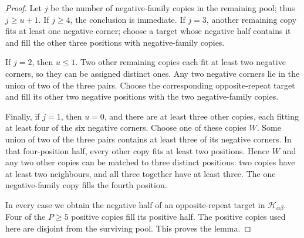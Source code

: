 \begin{proof}
Let $j$ be the number of negative-family copies in the remaining pool;
thus $j\ge u+1$. If $j\ge4$, the conclusion is immediate. If $j=3$,
another remaining copy fits at least one negative corner; choose a target
whose negative half contains it and fill the other three positions with
negative-family copies.

If $j=2$, then $u\le1$. Two other remaining copies each fit at least two
negative corners, so they can be assigned distinct ones. Any two negative
corners lie in the union of two of the three pairs. Choose the corresponding
opposite-repeat target and fill its other two negative positions with the
two negative-family copies.

Finally, if $j=1$, then $u=0$, and there are at least three other copies,
each fitting at least four of the six negative corners. Choose one of
these copies $W$. Some union of two of the three pairs contains at least
three of its negative corners. In that four-position half, every other
copy fits at least two positions. Hence $W$ and any two other copies can
be matched to three distinct positions: two copies have at least two
neighbours, and all three together have at least three. The one
negative-family copy fills the fourth position.

In every case we obtain the negative half of an opposite-repeat target
in $\mathcal H_{\alpha\beta}$. Four of the $P\ge5$ positive copies fill its
positive half. The positive copies used here are disjoint from the surviving pool. This proves the lemma.
\end{proof}


